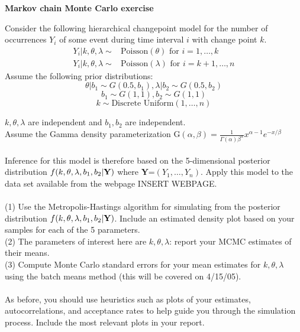 \documentclass[11pt]{article}
\begin{document}
\pagestyle{empty}
\begin{center}
\Large
{\bf  Markov chain Monte Carlo exercise}\\
\end{center}
\normalsize
Consider the following hierarchical changepoint model for the number
of occurrences $Y_i$ of some event during time interval $i$ with change point $k$.
\begin{equation*}
\begin{split}
Y_i |k,\theta,\lambda \sim & \mbox{Poisson}(\theta) \mbox{ for } i=1,\dots,k\\
Y_i |k,\theta,\lambda \sim & \mbox{Poisson}(\lambda) \mbox{ for } i=k+1,\dots,n
\end{split}
\end{equation*}
Assume the following prior distributions:
$$\theta|b_1 \sim  G(0.5,b_1), \lambda|b_2 \sim  G(0.5,b_2)$$
$$b_1 \sim  G(1,1), b_2 \sim  G(1,1)$$
$$ k \sim \mbox{Discrete Uniform}(1,\dots,n)$$

$k,\theta,\lambda$ are independent and $b_1,b_2$ are independent. \\ Assume the Gamma density parameterization G$(\alpha,\beta) = \frac{1}{\Gamma(\alpha)\beta^{\alpha}} x^{\alpha-1} e^{-x/\beta}$\\\\
Inference for this model is therefore based on the 5-dimensional
posterior distribution $f(k,\theta,\lambda,b_1,b_2| {\bf Y})$ where
{\bf Y}=$(Y_1,\dots,Y_n)$. Apply this model to the data set available from the webpage 
INSERT WEBPAGE.\\\\
(1) Use the Metropolis-Hastings algorithm for simulating from the
posterior distribution $f(k,\theta,\lambda,b_1,b_2| {\bf Y})$.
Include an estimated density plot based on your samples for each of
the 5 parameters.\\
(2) The parameters of interest here are $k,\theta,\lambda$: report
your MCMC estimates of their means.\\%
(3) Compute Monte Carlo standard errors for your mean estimates for
$k,\theta,\lambda$ using the batch means method (this will be covered on 4/15/05).\\\\
As before, you should use heuristics such as plots of your estimates,
autocorrelations, and acceptance rates to help guide you through the
simulation process. Include the most relevant plots in your report.\\
\end{document}
